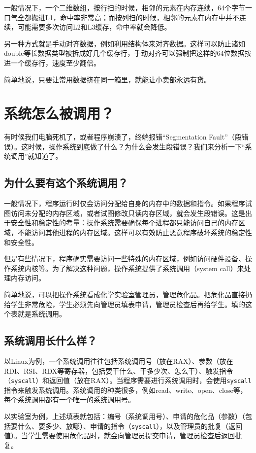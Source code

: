 \documentclass[../main.tex]{subfiles}
\begin{document}
一般情况下，一个二维数组，按行扫的时候，相邻的元素在内存连续，64个字节一口气全都搬进L1，命中率非常高；而按列扫的时候，相邻的元素在内存中并不连续，可能需要多次访问L2和L3缓存，命中率就会降低。

另一种方式就是手动对齐数据，例如利用结构体来对齐数据。这样可以防止诸如double等长数据类型被拆成好几个缓存行，手动对齐可以强制把这样的64位数据按进一个缓存行，速度至少翻倍。

简单地说，只要让常用数据挤在同一箱里，就能让小卖部永远有货。

\section{系统怎么被调用？}

有时候我们电脑死机了，或者程序崩溃了，终端报错“Segmentation Fault”（段错误）。这时候，操作系统到底做了什么？为什么会发生段错误？我们来分析一下“系统调用”就知道了。

\subsection{为什么要有这个系统调用？}

一般情况下，程序运行时仅会访问分配给自身的内存中的数据和指令。如果程序试图访问未分配的内存区域，或者试图修改只读内存区域，就会发生段错误。这是出于安全性和稳定性的考量：操作系统需要确保每个进程都只能访问自己的内存区域，不能访问其他进程的内存区域。这样可以有效防止恶意程序破坏系统的稳定性和安全性。

但是有些情况下，程序确实需要访问一些特殊的内存区域，例如访问硬件设备、操作系统内核等。为了解决这种问题，操作系统提供了系统调用（system call）来处理内存访问。

简单地说，可以把操作系统看成化学实验室管理员，管理危化品。把危化品直接扔给学生非常危险，学生必须先向管理员填表申请，管理员检查后再给学生。填的这个表就是系统调用。

\subsection{系统调用长什么样？}

以Linux为例，一个系统调用往往包括系统调用号（放在RAX）、参数（放在RDI、RSI、RDX等寄存器，包括要干什么、干多少次、怎么干）、触发指令（\texttt{syscall}）和返回值（放在RAX）。当程序需要进行系统调用时，会使用\texttt{syscall}指令来触发系统调用。系统调用的种类很多，例如read、write、open、close等，每个系统调用都有一个唯一的系统调用号。

以实验室为例，上述填表就包括：编号（系统调用号）、申请的危化品（参数）（包括要什么、要多少、放哪）、申请的指令（\texttt{syscall}），以及管理员的批复（返回值）。当学生需要使用危化品时，就会向管理员提交申请，管理员检查后返回批复。
\end{document}
